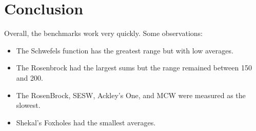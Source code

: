 \documentclass[paper=a4, fontsize=11pt]{scrartcl} %
\numberwithin{equation}{section} %
\numberwithin{figure}{section} %
\numberwithin{table}{section} %
\begin{document}
\section{Conclusion}

Overall, the benchmarks work very quickly. Some observations:
\begin{itemize}
\item The Schwefels function has the greatest range but with low averages.
\item The Rosenbrock had the largest sums but the range remained between 150 and 200.
\item The RosenBrock, SESW, Ackley's One, and MCW were measured as the slowest. 
\item Shekal's Foxholes had the smallest averages.
\end{itemize}


\end{document}
